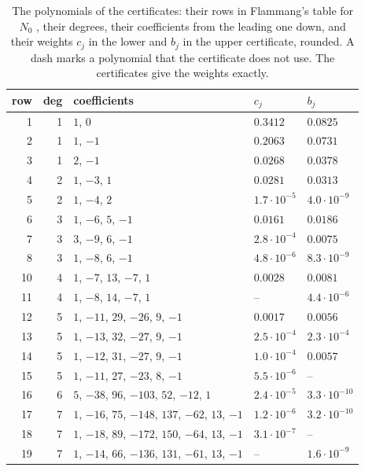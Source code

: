 \documentclass[11pt]{amsart}
\theoremstyle{remark}
\numberwithin{equation}{section}
\begin{document}
\begin{table}[p]
\caption{The polynomials of the certificates: their rows in Flammang's table for $N_0$ \cite[Table~2]{Fla15}, their degrees, their coefficients from the leading one down, and their weights $c_j$ in the lower and $b_j$ in the upper certificate, rounded. A dash marks a polynomial that the certificate does not use. The certificates give the weights exactly.}\label{tab:polys}
\scriptsize
\begin{tabular}{@{}rr>{\raggedright\arraybackslash}p{}ll@{}}
\toprule
row & deg & coefficients & $c_j$ & $b_j$\\
\midrule
1 & 1 & $1$, $0$ & $0.3412$ & $0.0825$\\
2 & 1 & $1$, $-1$ & $0.2063$ & $0.0731$\\
3 & 1 & $2$, $-1$ & $0.0268$ & $0.0378$\\
4 & 2 & $1$, $-3$, $1$ & $0.0281$ & $0.0313$\\
5 & 2 & $1$, $-4$, $2$ & $1.7\cdot10^{-5}$ & $4.0\cdot10^{-9}$\\
6 & 3 & $1$, $-6$, $5$, $-1$ & $0.0161$ & $0.0186$\\
7 & 3 & $3$, $-9$, $6$, $-1$ & $2.8\cdot10^{-4}$ & $0.0075$\\
8 & 3 & $1$, $-8$, $6$, $-1$ & $4.8\cdot10^{-6}$ & $8.3\cdot10^{-9}$\\
10 & 4 & $1$, $-7$, $13$, $-7$, $1$ & $0.0028$ & $0.0081$\\
11 & 4 & $1$, $-8$, $14$, $-7$, $1$ & -- & $4.4\cdot10^{-6}$\\
12 & 5 & $1$, $-11$, $29$, $-26$, $9$, $-1$ & $0.0017$ & $0.0056$\\
13 & 5 & $1$, $-13$, $32$, $-27$, $9$, $-1$ & $2.5\cdot10^{-4}$ & $2.3\cdot10^{-4}$\\
14 & 5 & $1$, $-12$, $31$, $-27$, $9$, $-1$ & $1.0\cdot10^{-4}$ & $0.0057$\\
15 & 5 & $1$, $-11$, $27$, $-23$, $8$, $-1$ & $5.5\cdot10^{-6}$ & --\\
16 & 6 & $5$, $-38$, $96$, $-103$, $52$, $-12$, $1$ & $2.4\cdot10^{-5}$ & $3.3\cdot10^{-10}$\\
17 & 7 & $1$, $-16$, $75$, $-148$, $137$, $-62$, $13$, $-1$ & $1.2\cdot10^{-6}$ & $3.2\cdot10^{-10}$\\
18 & 7 & $1$, $-18$, $89$, $-172$, $150$, $-64$, $13$, $-1$ & $3.1\cdot10^{-7}$ & --\\
19 & 7 & $1$, $-14$, $66$, $-136$, $131$, $-61$, $13$, $-1$ & -- & $1.6\cdot10^{-9}$\\

\end{tabular}
\end{table}
\end{document}
